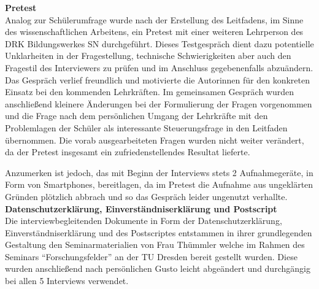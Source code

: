 \noindent
\textbf{Pretest}\\

\noindent
Analog zur Schülerumfrage wurde nach der Erstellung des Leitfadens, im Sinne des wissenschaftlichen Arbeitens, ein Pretest mit einer weiteren Lehrperson des DRK Bildungswerkes SN durchgeführt. Dieses Testgespräch dient dazu potentielle Unklarheiten in der Fragestellung, technische Schwierigkeiten aber auch den Fragestil des Interviewers zu prüfen und im Anschluss gegebenenfalls abzuändern. Das Gespräch verlief freundlich und motivierte die Autorinnen für den konkreten Einsatz bei den kommenden Lehrkräften. Im gemeinsamen Gespräch wurden anschließend kleinere Änderungen bei der Formulierung der Fragen vorgenommen und die Frage nach dem persönlichen Umgang der Lehrkräfte mit den Problemlagen der Schüler als interessante Steuerungsfrage in den Leitfaden übernommen. Die vorab ausgearbeiteten Fragen wurden nicht weiter verändert, da der Pretest insgesamt ein zufriedenstellendes Resultat lieferte. 

Anzumerken ist jedoch, das mit Beginn der Interviews stets 2 Aufnahmegeräte, in Form von Smartphones, bereitlagen, da im Pretest die Aufnahme aus ungeklärten Gründen plötzlich abbrach und so das Gespräch leider ungenutzt verhallte.\\

\noindent
\textbf{Datenschutzerklärung, Einverständniserklärung und Postscript}\\

\noindent
Die interviewbegleitenden Dokumente in Form der Datenschutzerklärung, Einverständniserklärung und des Postscriptes entstammen in ihrer grundlegenden Gestaltung den Seminarmaterialien von Frau Thümmler welche im Rahmen des Seminars "`Forschungsfelder"' an der TU Dresden bereit gestellt wurden. Diese wurden anschließend nach persönlichen Gusto leicht abgeändert und durchgängig bei allen 5 Interviews verwendet.

